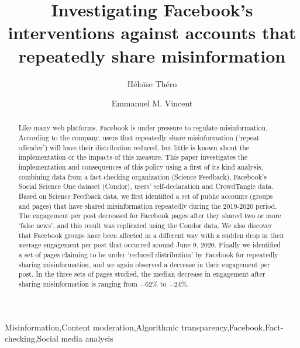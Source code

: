 \documentclass[review]{elsarticle}
\begin{document}
\begin{frontmatter}

\title{Investigating Facebook's interventions against accounts that repeatedly share misinformation}

\author[mymainaddress]{Héloïse Théro}

\author[mymainaddress]{Emmanuel M. Vincent}

\address[mymainaddress]{médialab - Sciences Po, Paris, France}

\begin{abstract}

Like many web platforms, Facebook is under pressure to regulate misinformation.
According to the company, users that repeatedly share misinformation (`repeat offender') will have their distribution reduced, but little is known about the implementation or the impacts of this measure.
This paper investigates the implementation and consequences of this policy using a first of its kind analysis, combining data from a fact-checking organization (Science Feedback), Facebook’s Social Science One dataset (Condor), users’ self-declaration and CrowdTangle data. 
Based on Science Feedback data, we first identified a set of public accounts (groups and pages) that have shared misinformation repeatedly during the 2019-2020 period.
The engagement per post decreased for Facebook pages after they shared two or more `false news’, and this result was replicated using the Condor data.
We also discover that Facebook groups have been affected in a different way with a sudden drop in their average engagement per post that occurred around June 9, 2020.
Finally we identified a set of pages claiming to be under `reduced distribution' by Facebook for repeatedly sharing misinformation, and we again observed a decrease in their engagement per post.
In the three sets of pages studied, the median decrease in engagement after sharing misinformation is ranging from $-62\%$ to $-24\%$.

\end{abstract}

\begin{keyword}
Misinformation\sep Content moderation\sep Algorithmic transparency\sep Facebook\sep Fact-checking\sep Social media analysis
\end{keyword}

\end{frontmatter}
\end{document}
